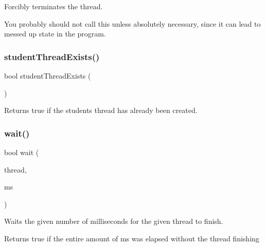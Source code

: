 Forcibly terminates the thread. 

You probably should not call this unless absolutely necessary, since it can lead to messed up state in the program. \mbox{\label{classsgl_1_1GThread_af75b92d7df24cf0e2f06193944b9db32}} 
\subsubsection{\texorpdfstring{student\+Thread\+Exists()}{studentThreadExists()}}
{\footnotesize\ttfamily bool student\+Thread\+Exists (\begin{DoxyParamCaption}{ }\end{DoxyParamCaption})\hspace{0.3cm}{\ttfamily [static]}}



Returns true if the student\textquotesingle{}s thread has already been created. 

\mbox{\label{classsgl_1_1GThread_a231df01e3224a1c4a109613a891f554e}} 
\subsubsection{\texorpdfstring{wait()}{wait()}}
{\footnotesize\ttfamily bool wait (\begin{DoxyParamCaption}\item[{\mbox{\hyperlink{classsgl_1_1GThread}{G\+Thread}} $\ast$}]{thread,  }\item[{long}]{ms }\end{DoxyParamCaption})\hspace{0.3cm}{\ttfamily [static]}}



Waits the given number of milliseconds for the given thread to finish. 

\begin{DoxyReturn}{Returns}
true if the entire amount of ms was elapsed without the thread finishing 
\end{DoxyReturn}
\mbox{\label{classsgl_1_1GThread_a77a5c1943920f355bd1db8cb99bddcfc}} 
